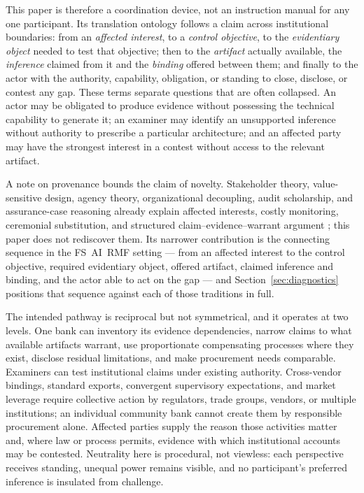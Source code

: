 This paper is therefore a coordination device, not an instruction manual for any one participant. Its translation ontology follows a claim across institutional boundaries: from an \emph{affected interest}, to a \emph{control objective}, to the \emph{evidentiary object} needed to test that objective; then to the \emph{artifact} actually available, the \emph{inference} claimed from it and the \emph{binding} offered between them; and finally to the actor with the authority, capability, obligation, or standing to close, disclose, or contest any gap. These terms separate questions that are often collapsed. An actor may be obligated to produce evidence without possessing the technical capability to generate it; an examiner may identify an unsupported inference without authority to prescribe a particular architecture; and an affected party may have the strongest interest in a contest without access to the relevant artifact.

A note on provenance bounds the claim of novelty. Stakeholder theory, value-sensitive design, agency theory, organizational decoupling, audit scholarship, and assurance-case reasoning already explain affected interests, costly monitoring, ceremonial substitution, and structured claim--evidence--warrant argument \parencite{freeman1984,friedman1996,jensenMeckling1976,meyer1977,power1997,bloomfield2010}; this paper does not rediscover them. Its narrower contribution is the connecting sequence in the FS~AI~RMF setting --- from an affected interest to the control objective, required evidentiary object, offered artifact, claimed inference and binding, and the actor able to act on the gap --- and Section~\ref{sec:diagnostics} positions that sequence against each of those traditions in full.

The intended pathway is reciprocal but not symmetrical, and it operates at two levels. One bank can inventory its evidence dependencies, narrow claims to what available artifacts warrant, use proportionate compensating processes where they exist, disclose residual limitations, and make procurement needs comparable. Examiners can test institutional claims under existing authority. Cross-vendor bindings, standard exports, convergent supervisory expectations, and market leverage require collective action by regulators, trade groups, vendors, or multiple institutions; an individual community bank cannot create them by responsible procurement alone. Affected parties supply the reason those activities matter and, where law or process permits, evidence with which institutional accounts may be contested. Neutrality here is procedural, not viewless: each perspective receives standing, unequal power remains visible, and no participant's preferred inference is insulated from challenge.

